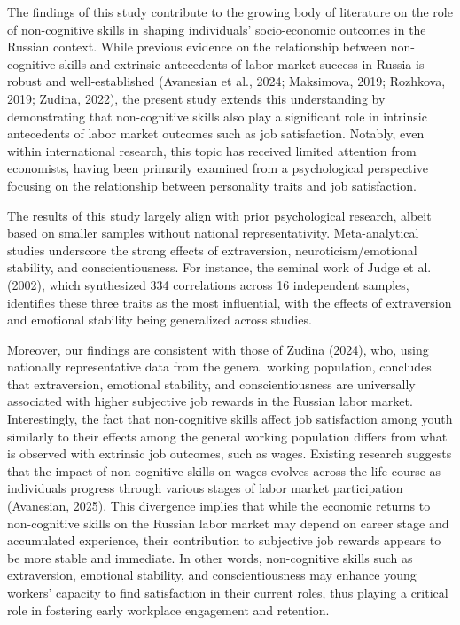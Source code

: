 \documentclass[
]{interact}
\begin{document}
The findings of this study contribute to the growing body of literature
on the role of non-cognitive skills in shaping individuals'
socio-economic outcomes in the Russian context. While previous evidence
on the relationship between non-cognitive skills and extrinsic
antecedents of labor market success in Russia is robust and
well-established (Avanesian et al., 2024; Maksimova, 2019; Rozhkova,
2019; Zudina, 2022), the present study extends this understanding by
demonstrating that non-cognitive skills also play a significant role in
intrinsic antecedents of labor market outcomes such as job satisfaction.
Notably, even within international research, this topic has received
limited attention from economists, having been primarily examined from a
psychological perspective focusing on the relationship between
personality traits and job satisfaction.

The results of this study largely align with prior psychological
research, albeit based on smaller samples without national
representativity. Meta-analytical studies underscore the strong effects
of extraversion, neuroticism/emotional stability, and conscientiousness.
For instance, the seminal work of Judge et al. (2002), which synthesized
334 correlations across 16 independent samples, identifies these three
traits as the most influential, with the effects of extraversion and
emotional stability being generalized across studies.

Moreover, our findings are consistent with those of Zudina (2024), who,
using nationally representative data from the general working
population, concludes that extraversion, emotional stability, and
conscientiousness are universally associated with higher subjective job
rewards in the Russian labor market. Interestingly, the fact that
non-cognitive skills affect job satisfaction among youth similarly to
their effects among the general working population differs from what is
observed with extrinsic job outcomes, such as wages. Existing research
suggests that the impact of non-cognitive skills on wages evolves across
the life course as individuals progress through various stages of labor
market participation (Avanesian, 2025). This divergence implies that
while the economic returns to non-cognitive skills on the Russian labor
market may depend on career stage and accumulated experience, their
contribution to subjective job rewards appears to be more stable and
immediate. In other words, non-cognitive skills such as extraversion,
emotional stability, and conscientiousness may enhance young workers'
capacity to find satisfaction in their current roles, thus playing a
critical role in fostering early workplace engagement and retention.
\end{document}

